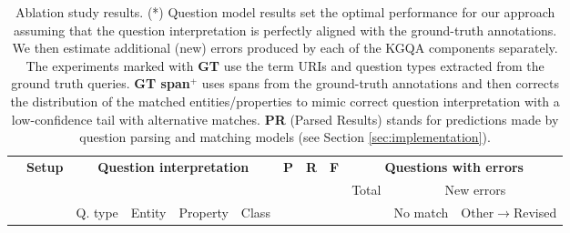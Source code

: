 \begin{table}[!t]
\caption{Ablation study results. (*) Question model results set the optimal performance for our approach assuming that the question interpretation is perfectly aligned with the ground-truth annotations. We then estimate additional (new) errors produced by each of the KGQA components separately. The experiments marked with {\bf GT} use the term URIs and question types extracted from the ground truth queries. {\bf GT span$^+$} uses spans from the ground-truth annotations and then corrects the distribution of the matched entities/properties to mimic correct question interpretation with a low-confidence tail with alternative matches. {\bf PR} (Parsed Results) stands for predictions made by question parsing and matching models (see Section \ref{sec:implementation}).}
\label{tab:results2}
 \setlength{\tabcolsep}{5pt}
\centering\small
\begin{tabular}{ll|cccc|ccc|c|cc}
\hline
 &    \multirow{3}{*}{\bf Setup}              & \multicolumn{4}{c|}{\multirow{2}{*}{\bf Question interpretation}} &  \multirow{3}{*}{\bf P}  & \multirow{3}{*}{\bf R} & \multirow{3}{*}{\bf F}& \multicolumn{3}{c}{\bf Questions with errors}       \\
\cline{10-12}
   &    &  &  & &    &     &   &    & \multirow{2}{*}{Total}           & \multicolumn{2}{c}{New errors} \\
   \cline{3-6}\cline{11-12}
   &    & Q. type & Entity & Property & Class   &   &   &  &        & No match & Other$\rightarrow$Revised  \\
   

\end{tabular}
\end{table}
